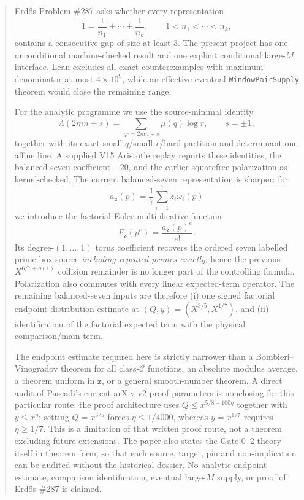 \documentclass[11pt]{article}
\theoremstyle{definition}
\newcommand{\1}{\mathbf 1}
\begin{document}
\begin{abstract}
Erd\H{o}s Problem \#287 asks whether every representation
\[
1=\frac1{n_1}+\cdots+\frac1{n_k},\qquad 1<n_1<\cdots<n_k,
\]
contains a consecutive gap of size at least $3$.  The present project has one unconditional
machine-checked result and one explicit conditional large-$M$ interface.  Lean excludes
all exact counterexamples with maximum denominator at most $4\times10^9$, while an
effective eventual \texttt{WindowPairSupply} theorem would close the remaining range.

For the analytic programme we use the source-minimal identity
\[
\Lambda(2mn+s)=\sum_{qr=2mn+s}\mu(q)\log r,\qquad s=\pm1,
\]
together with its exact small-$q$/small-$r$/hard partition and determinant-one affine line.
A supplied V15 Aristotle replay reports these identities, the balanced-seven coefficient
$-20$, and the earlier squarefree polarization as kernel-checked.  The current balanced-seven
representation is sharper: for
\[
a_{\mathbf z}(p)=\frac17\sum_{i=1}^7z_i\omega_i(p)
\]
we introduce the factorial Euler multiplicative function
\[
F_{\mathbf z}(p^e)=\frac{a_{\mathbf z}(p)^e}{e!}.
\]
Its degree-$(1,\ldots,1)$ torus coefficient recovers the ordered seven labelled prime-box
source \emph{including repeated primes exactly}; hence the previous
$X^{6/7+o(1)}$ collision remainder is no longer part of the controlling formula.
Polarization also commutes with every linear expected-term operator.  The remaining
balanced-seven inputs are therefore (i) one signed factorial endpoint distribution estimate
at $(Q,y)=(X^{3/5},X^{1/7})$, and (ii) identification of the factorial expected term with
the physical comparison/main term.

The endpoint estimate required here is strictly narrower than a Bombieri--Vinogradov theorem
for all class-$\mathcal C$ functions, an absolute modulus average, a theorem uniform in
$\mathbf z$, or a general smooth-number theorem.  A direct audit of Pascadi's current
arXiv v2 proof parameters is nonclosing for this particular route: the proof architecture
uses $Q\le x^{5/8-100\eta}$ together with $y\le x^\eta$; setting
$Q=x^{3/5}$ forces $\eta\le1/4000$, whereas $y=x^{1/7}$ requires
$\eta\ge1/7$.  This is a limitation of that written proof route, not a theorem excluding
future extensions.  The paper also states the Gate 0--2 theory itself in theorem form, so that each source, target, pin and non-implication can be audited without the historical dossier.  No analytic endpoint estimate, comparison identification, eventual
large-$M$ supply, or proof of Erd\H{o}s \#287 is claimed.
\end{abstract}
\end{document}
